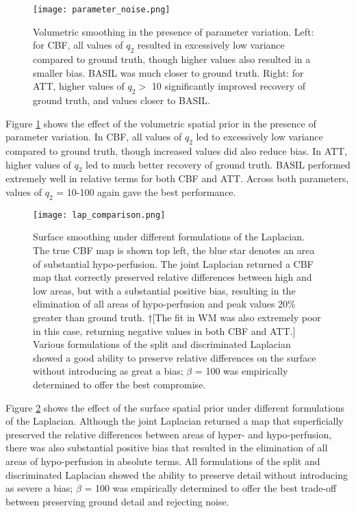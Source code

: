 \begin{figure}[H]
\centering
\texttt{[image: parameter\_noise.png]}
\caption{Volumetric smoothing in the presence of parameter variation. Left: for CBF, all values of $q_2$ resulted in excessively low variance compared to ground truth, though higher values also resulted in a smaller bias. BASIL was much closer to ground truth. Right: for ATT, higher values of $q_2 >$ 10 significantly improved recovery of ground truth, and values closer to BASIL.}
\label{parameter_noise} 
\end{figure}

Figure \ref{parameter_noise} shows the effect of the volumetric spatial prior in the presence of parameter variation. In CBF, all values of $q_2$ led to excessively low variance compared to ground truth, though increased values did also reduce bias. In ATT, higher values of $q_2$ led to much better recovery of ground truth. BASIL performed extremely well in relative terms for both CBF and ATT. Across both parameters, values of $q_2$ = 10-100 again gave the best performance. 

\begin{figure}[H]
\centering
\texttt{[image: lap\_comparison.png]}
\caption{Surface smoothing under different formulations of the Laplacian. The true CBF map is shown top left, the blue star denotes an area of substantial hypo-perfusion. The joint Laplacian returned a CBF map that correctly preserved relative differences between high and low areas, but with a substantial positive bias, resulting in the elimination of all areas of hypo-perfusion and peak values 20\% greater than ground truth. †[The fit in WM was also extremely poor in this case, returning negative values in both CBF and ATT.] Various formulations of the split and discriminated Laplacian showed a good ability to preserve relative differences on the surface without introducing as great a bias; $\beta$ = 100 was empirically determined to offer the best compromise.}
\label{lap_comparison} 
\end{figure}

Figure \ref{lap_comparison} shows the effect of the surface spatial prior under different formulations of the Laplacian. Although the joint Laplacian returned a map that superficially preserved the relative differences between areas of hyper- and hypo-perfusion, there was also substantial positive bias that resulted in the elimination of all areas of hypo-perfusion in absolute terms. All formulations of the split and discriminated Laplacian showed the ability to preserve detail without introducing as severe a bias; $\beta$ = 100 was empirically determined to offer the best trade-off between preserving ground detail and rejecting noise. 

